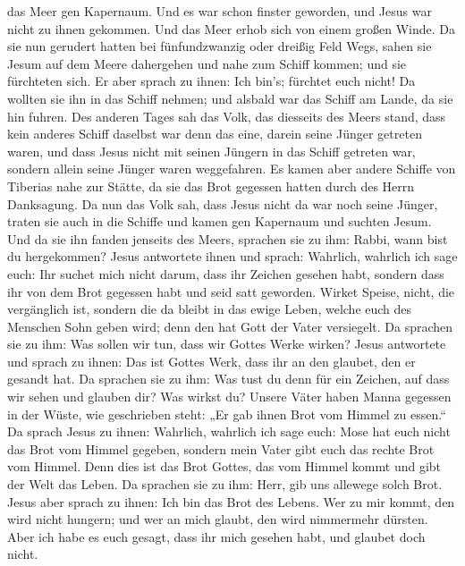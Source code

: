 das Meer gen Kapernaum. Und es war schon finster geworden, und Jesus war
nicht zu ihnen gekommen.  Und das Meer erhob sich von einem
großen Winde.  Da sie nun gerudert hatten bei
fünfundzwanzig oder dreißig Feld Wegs, sahen sie Jesum auf dem Meere
dahergehen und nahe zum Schiff kommen; und sie fürchteten sich.
 Er aber sprach zu ihnen: Ich bin's; fürchtet euch nicht!
 Da wollten sie ihn in das Schiff nehmen; und alsbald war
das Schiff am Lande, da sie hin fuhren.  Des anderen Tages
sah das Volk, das diesseits des Meers stand, dass kein anderes Schiff
daselbst war denn das eine, darein seine Jünger getreten waren, und dass
Jesus nicht mit seinen Jüngern in das Schiff getreten war, sondern
allein seine Jünger waren weggefahren.  Es kamen aber
andere Schiffe von Tiberias nahe zur Stätte, da sie das Brot gegessen
hatten durch des Herrn Danksagung.  Da nun das Volk sah,
dass Jesus nicht da war noch seine Jünger, traten sie auch in die
Schiffe und kamen gen Kapernaum und suchten Jesum.  Und da
sie ihn fanden jenseits des Meers, sprachen sie zu ihm: Rabbi, wann bist
du hergekommen?  Jesus antwortete ihnen und sprach:
Wahrlich, wahrlich ich sage euch: Ihr suchet mich nicht darum, dass ihr
Zeichen gesehen habt, sondern dass ihr von dem Brot gegessen habt und
seid satt geworden.  Wirket Speise, nicht, die vergänglich
ist, sondern die da bleibt in das ewige Leben, welche euch des Menschen
Sohn geben wird; denn den hat Gott der Vater versiegelt. 
Da sprachen sie zu ihm: Was sollen wir tun, dass wir Gottes Werke
wirken?  Jesus antwortete und sprach zu ihnen: Das ist
Gottes Werk, dass ihr an den glaubet, den er gesandt hat. 
Da sprachen sie zu ihm: Was tust du denn für ein Zeichen, auf dass wir
sehen und glauben dir? Was wirkst du?  Unsere Väter haben
Manna gegessen in der Wüste, wie geschrieben steht: „Er gab ihnen Brot
vom Himmel zu essen.``  Da sprach Jesus zu ihnen: Wahrlich,
wahrlich ich sage euch: Mose hat euch nicht das Brot vom Himmel gegeben,
sondern mein Vater gibt euch das rechte Brot vom Himmel. 
Denn dies ist das Brot Gottes, das vom Himmel kommt und gibt der Welt
das Leben.  Da sprachen sie zu ihm: Herr, gib uns allewege
solch Brot.  Jesus aber sprach zu ihnen: Ich bin das Brot
des Lebens. Wer zu mir kommt, den wird nicht hungern; und wer an mich
glaubt, den wird nimmermehr dürsten.  Aber ich habe es euch
gesagt, dass ihr mich gesehen habt, und glaubet doch nicht.
